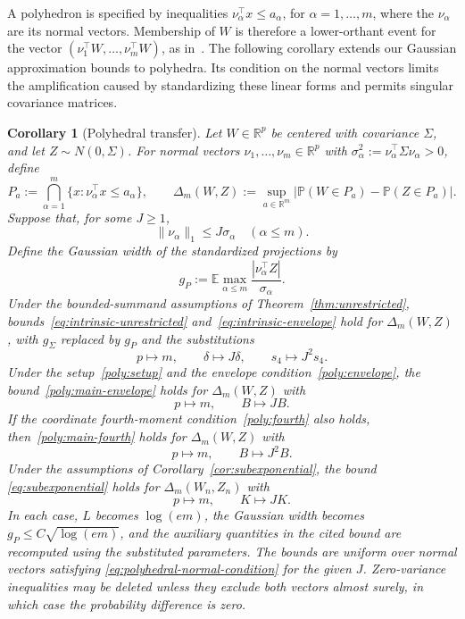 \documentclass[11pt,letterpaper,twoside,leqno]{article}
\theoremstyle{bookplain}
\newtheorem{corollary}{Corollary}
\theoremstyle{bookremark}
\newcommand{\E}{\mathbb E}
\newcommand{\Pp}{\mathbb P}
\newcommand{\R}{\mathbb R}
\begin{document}
{
A polyhedron is specified by inequalities
\(\nu_\alpha^\top x\le a_\alpha\), for \(\alpha=1,\ldots,m\),
where the \(\nu_\alpha\) are its normal vectors. Membership of
\(W\) is therefore a lower-orthant event for the vector
\((\nu_1^\top W,\ldots,\nu_m^\top W)\), as
in~\cite[Section~3.1]{CCK2017}.
The following corollary extends our Gaussian approximation bounds to
polyhedra. Its condition on the normal vectors limits the amplification
caused by standardizing these linear forms and permits singular
covariance matrices.
}

{
\begin{corollary}[Polyhedral transfer]\label{cor:polyhedral-transfer}
Let \(W\in\R^p\) be centered with covariance \(\Sigma\), and let
\(Z\sim N(0,\Sigma)\). For normal vectors \(\nu_1,\ldots,\nu_m\in\R^p\)
with \(\sigma_\alpha^2:=\nu_\alpha^\top\Sigma\nu_\alpha>0\), define
\[
 P_a:=\bigcap_{\alpha=1}^m\{x:\nu_\alpha^\top x\le a_\alpha\},
 \qquad
 \Delta_m(W,Z):=\sup_{a\in\R^m}
 \bigl|\Pp(W\in P_a)-\Pp(Z\in P_a)\bigr|.
\]
Suppose that, for some \(J\ge1\),
\begin{equation}
 \|\nu_\alpha\|_1\le J\sigma_\alpha\quad(\alpha\le m).
 \label{eq:polyhedral-normal-condition}
\end{equation}
{Define the Gaussian width of the standardized projections by}
\[
 {g_P:=\E\max_{\alpha\le m}
                  \frac{|\nu_\alpha^\top Z|}{\sigma_\alpha}.}
\]
Under the bounded-summand assumptions of Theorem~\ref{thm:unrestricted},
{bounds~\eqref{eq:intrinsic-unrestricted} and~\eqref{eq:intrinsic-envelope}
hold for \(\Delta_m(W,Z)\), with \(g_\Sigma\) replaced by \(g_P\)
and the substitutions}
\[
 p\mapsto m,\qquad \delta\mapsto J\delta,\qquad s_4\mapsto J^2s_4.
\]
Under the setup~\eqref{poly:setup} and the envelope
condition~\eqref{poly:envelope}, the bound~\eqref{poly:main-envelope}
holds for \(\Delta_m(W,Z)\) with
\[
 p\mapsto m,\qquad B\mapsto JB.
\]
If the coordinate fourth-moment condition~\eqref{poly:fourth} also holds,
then~\eqref{poly:main-fourth} holds for \(\Delta_m(W,Z)\) with
\[
 p\mapsto m,\qquad B\mapsto J^2B.
\]
Under the assumptions of Corollary~\ref{cor:subexponential},
the bound \eqref{eq:subexponential} holds for \(\Delta_m(W_n,Z_n)\) with
\[
 p\mapsto m,\qquad K\mapsto JK.
\]
{In each case, \(L\) becomes \(\log(em)\), the Gaussian width
becomes \(g_P\le C\sqrt{\log(em)}\), and the auxiliary quantities
in the cited bound are recomputed using the substituted parameters.}
The bounds are uniform over normal vectors satisfying
\eqref{eq:polyhedral-normal-condition} for the given \(J\).
Zero-variance inequalities may be deleted unless they exclude both
vectors almost surely, in which case the probability difference is zero.
\end{corollary}
}
\end{document}
